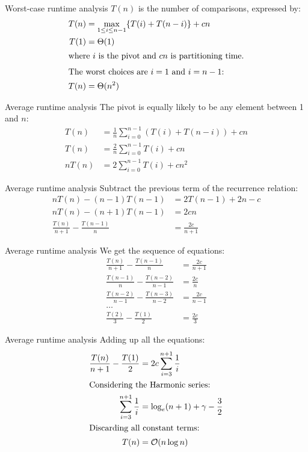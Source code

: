 \documentclass{beamer}
\begin{document}
\begin{frame}{Worst-case runtime analysis}
    $T(n)$ is the number of comparisons, expressed by:
    \begin{align*}
        T(n) &= \max_{1\leq i\leq n-1} \{T(i)+T(n-i)\} + cn \\
        T(1) &= \Theta(1) \\
        \intertext{where $i$ is the pivot and $cn$ is partitioning time.}
        \intertext{The worst choices are $i=1$ and $i=n-1$:}
        T(n) &= \Theta(n^2)
    \end{align*}
\end{frame}
\begin{frame}{Average runtime analysis}
    The pivot is equally likely to be any element between 1 and $n$:
    \begin{align*}
        T(n) &= \frac{1}{n} \sum_{i=0}^{n-1} \left(T(i) + T(n-i)\right) + cn \\
        T(n) &= \frac{2}{n} \sum_{i=0}^{n-1} T(i) + cn \\
        nT(n) &= 2 \sum_{i=0}^{n-1} T(i) + cn^2
    \end{align*}
\end{frame}
\begin{frame}{Average runtime analysis}
    Subtract the previous term of the recurrence relation:
    \begin{align*}
        nT(n) - (n-1)T(n-1) &= 2T(n-1) + 2n - c \\[1em]
        nT(n) - (n+1)T(n-1) &= 2cn \\[1em]
        \frac{T(n)}{n+1} - \frac{T(n-1)}{n} &= \frac{2c}{n+1}
    \end{align*}
\end{frame}
\begin{frame}{Average runtime analysis}
    We get the sequence of equations:
    \begin{align*}
        \frac{T(n)}{n+1} - \frac{T(n-1)}{n} &= \frac{2c}{n+1} \\
        \frac{T(n-1)}{n} - \frac{T(n-2)}{n-1} &= \frac{2c}{n} \\
        \frac{T(n-2)}{n-1} - \frac{T(n-3)}{n-2} &= \frac{2c}{n-1} \\
        \dots& \\
        \frac{T(2)}{3} - \frac{T(1)}{2} &= \frac{2c}{3}
    \end{align*}
\end{frame}
\begin{frame}{Average runtime analysis}
    Adding up all the equations:
    \begin{align*}
        \frac{T(n)}{n+1} - \frac{T(1)}{2} &= 2c\sum_{i=3}^{n+1}\frac{1}{i} \\
        \intertext{Considering the Harmonic series:}
        \sum_{i=3}^{n+1}\frac{1}{i} &= \log_e(n+1) + \gamma - \frac{3}{2} \\
        \intertext{Discarding all constant terms:}
        T(n) &= \mathcal{O}(n\log n)
    \end{align*}
\end{frame}
\end{document}
